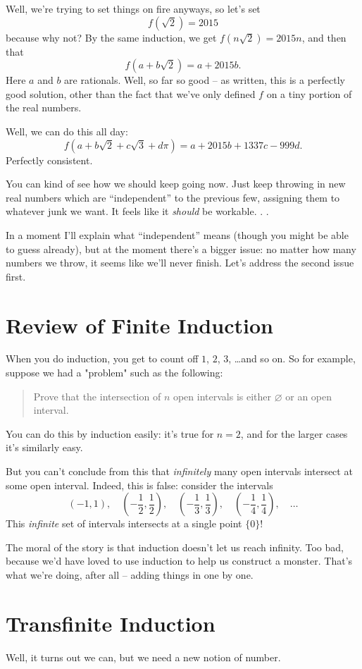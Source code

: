 Well, we're trying to set things on fire anyways, so let's set
\[ f(\sqrt 2) = 2015 \]
because why not?
By the same induction, we get $f(n\sqrt2) = 2015n$, and then that
\[ f\left( a + b \sqrt 2 \right) = a + 2015b. \]
Here $a$ and $b$ are rationals.
Well, so far so good -- as written, this is a perfectly good solution,
other than the fact that we've only defined $f$ on a tiny portion of the real numbers.

Well, we can do this all day:
\[ f\left( a + b \sqrt 2 + c \sqrt 3 + d \pi \right) = a + 2015b + 1337c - 999d. \]
Perfectly consistent.

You can kind of see how we should keep going now.
Just keep throwing in new real numbers which are ``independent''
to the previous few, assigning them to whatever junk we want.
It feels like it \emph{should} be workable. . .

In a moment I'll explain what ``independent'' means (though you
might be able to guess already), but at the moment there's a bigger issue:
no matter how many numbers we throw, it seems like we'll never finish.
Let's address the second issue first.

\section{Review of Finite Induction}
When you do induction, you get to count off $1$, $2$, $3$, \dots and so on.
So for example, suppose we had a "problem" such as the following:
\begin{quote}
	Prove that the intersection of $n$ open intervals is either $\varnothing$
	or an open interval.
\end{quote}
You can do this by induction easily: it's true for $n = 2$, and
for the larger cases it's similarly easy.

But you can't conclude from this that \emph{infinitely} many open intervals intersect
at some open interval. Indeed, this is false: consider the intervals
\[
	\left( -1, 1 \right), \quad
	\left( -\frac12, \frac12 \right), \quad
	\left( -\frac13, \frac13 \right), \quad
	\left( -\frac14, \frac14 \right), \quad
	\dots
\]
This \emph{infinite} set of intervals intersects at a single point $\{0\}$!

The moral of the story is that induction doesn't let us reach infinity.
Too bad, because we'd have loved to use induction to help us construct a monster.
That's what we're doing, after all -- adding things in one by one.

\section{Transfinite Induction}
Well, it turns out we can, but we need a new notion of number.

